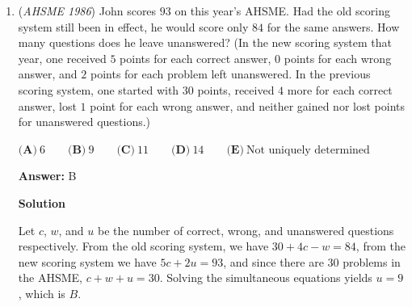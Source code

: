 \begin{enumerate}
In a right triangle, the length of the hypotenuse is twice the length of the median which bisects it. If the hypotenuse is $13$, the median must be $6.5$.

 



\textbf{Solution 2 (Self Torture)}

Warning: this solution is very intensive in calculation. Please do NOT try this on the test!

 Let's start by finding $AH$. By Heron's Formula, $s=\frac{13+14+15}{2}=21, [ABC]=\sqrt{21*(21-13)(21-14)(21-15)}=84$. Using the area formula $A=0.5bh$, $AH=12$. Now using the Pythagorean Theorem, $BH=5, HC=9$.

 Now $AM=MB=6.5$. Using Stewart's Theorem on $\triangle{ABH}$, letting $HM=x$:

 $13*6.5*6.5+13x^2=12*6.5*12+5*6.5*5$ (remember that Stewart's Theorem is $man+dad=bmb+cnc$).

 Thus $x=6.5$ or $x=-6.5$ (reject this solution since $x$ is positive). Thus $HM=6.5$. Select $\boxed{B}$.

 P.S.: Although this is torturous, this is a good practice of Heron's formula and Stewart's theorem though.

 


	\item (\textit{AHSME 1986}) John scores $93$ on this year's AHSME. Had the old scoring system still been in effect, he would score only $84$ for the same answers. 
How many questions does he leave unanswered? (In the new scoring system that year, one received $5$ points for each correct answer,
$0$ points for each wrong answer, and $2$ points for each problem left unanswered. In the previous scoring system, 
one started with $30$ points, received $4$ more for each correct answer, 
lost $1$ point for each wrong answer, and neither gained nor lost points for unanswered questions.)


 $\textbf{(A)}\ 6\qquad \textbf{(B)}\ 9\qquad \textbf{(C)}\ 11\qquad \textbf{(D)}\ 14\qquad \textbf{(E)}\ \text{Not uniquely determined}$

 \textbf{Answer: }B



\textbf{Solution}

Let $c$, $w$, and $u$ be the number of correct, wrong, and unanswered questions respectively. From the old scoring system, we have $30+4c-w=84$, from the new scoring system we have $5c+2u=93$, and since there are $30$ problems in the AHSME, $c+w+u=30$. Solving the simultaneous equations yields $u=9$, which is $\boxed{B}$.


\end{enumerate}
